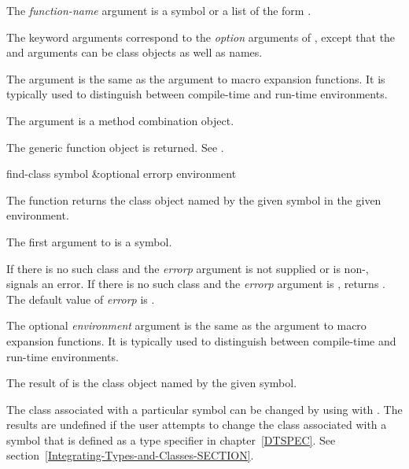 \begin{defun}[Function]
The \emph{function-name\/} argument is a symbol or a list of the
form .

The keyword arguments correspond to the \emph{option\/} arguments of
, except that the  and
 arguments can be class objects
as well as names.


The  argument is the same as the 
 argument to macro expansion functions.  It is typically
used to distinguish between compile-time and run-time environments.

The  argument is a method combination object.


The generic function object is returned.
See .
\end{defun}


\begin{defun}[Function]
find-class symbol &optional errorp environment

The function  returns the class object named by the
given symbol in the given environment.




The first argument to  is a symbol. 

If there is no such class and the \emph{errorp\/} argument is
not supplied or is non-,  signals an error.
If there is no such class and the \emph{errorp\/} argument is
,  returns .  The default value of
\emph{errorp\/} is .

The optional \emph{environment\/} argument is the same as the 
 argument to macro expansion functions.  It is typically
used to distinguish between compile-time and run-time environments.


The result of  is the class object named by the given symbol.


The class associated with a particular symbol can be changed by using
 with .  The results are undefined if
the user attempts to change the class associated with a symbol that is
defined as a type specifier in chapter~\ref{DTSPEC}.
See section~\ref{Integrating-Types-and-Classes-SECTION}.

\end{defun}


